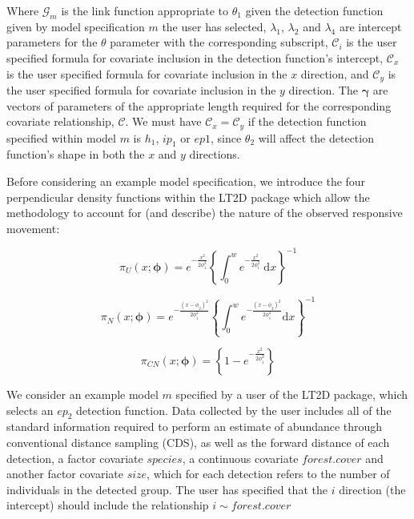 \documentclass[11pt]{article}
\begin{document}
\begin{multicols}{2}
Where $\mathcal{G}_m$ is the link function appropriate to $\theta_1$ given the detection function given by model specification $m$ the user has selected, $\lambda_1$, $\lambda_2$ and $\lambda_4$ are intercept parameters for the $\theta$ parameter with the corresponding subscript, $\mathcal{C}_i$ is the user specified formula for covariate inclusion in the detection function's intercept, $\mathcal{C}_x$ is the user specified formula for covariate inclusion in the $x$ direction, and $\mathcal{C}_y$ is the user specified formula for covariate inclusion in the $y$ direction. The $\boldsymbol{\gamma}$ are vectors of parameters of the appropriate length required for the corresponding covariate relationship, $\mathcal{C}$. We must have $\mathcal{C}_x=\mathcal{C}_y$ if the detection function specified within model $m$ is $h_1$, $ip_1$ or $ep1$, since $\theta_2$ will affect the detection function's shape in both the $x$ and $y$ directions.

Before considering an example model specification, we introduce the four perpendicular density functions within the LT2D package which allow the methodology to account for (and describe) the nature of the observed responsive movement:

\begingroup
\large

\begin{equation}
\pi_U\left(x;\boldsymbol{\phi}\right) = e^{-\frac{x^2}{2\phi_1^2}}\left\{\int_0^w{e^{-{\frac{x^2}{2\phi_1^2}}}\ \mathrm{d}x}\right\}^{-1}
\end{equation}

\begin{equation}
\pi_N\left(x;\boldsymbol{\phi}\right) = e^{-\frac{\left(x-\phi_2\right)^2}{2\phi_1^2}}\left\{\int_0^w{e^{-\frac{\left(x-\phi_2\right)^2}{2\phi_1^2}}\mathrm{d}x}\right\}^{-1}
\end{equation}

\begin{equation}
\pi_{CN}\left(x;\boldsymbol{\phi}\right) = \left\{1-e^{-\frac{x^2}{2\phi_1^2}}\right\}
\end{equation}
\endgroup

 We consider an example model $m$ specified by a user of the LT2D package, which selects an $ep_2$ detection function. Data collected by the user includes all of the standard information required to perform an estimate of abundance through conventional distance sampling (CDS), as well as the forward distance of each detection, a factor covariate $species$, a continuous covariate $forest.cover$ and another factor covariate $size$, which for each detection refers to the number of individuals in the detected group. The user has specified that the $i$ direction (the intercept) should include the relationship $i\sim forest.cover$



\end{multicols}
\end{document}

